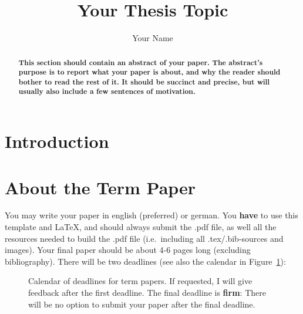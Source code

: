 \documentclass[twocolumn, a4paper, 10pt]{article}
\begin{document}
\title{\Large Your Thesis Topic}

\author{
	Your Name
}

\maketitle

\def\abstractname{{\textbf Abstract}}
\begin{abstract}
{
\bfseries
This section should contain an abstract of your paper. The abstract's purpose is to report what your paper is about, and why the reader should bother to read the rest of it. It should be succinct and precise, but will usually also include a few sentences of motivation.
}
\end{abstract}


\section{Introduction}
\lipsum[1-3]
\section{About the Term Paper}
You may write your paper in english (preferred) or german. You \textbf{have} to use this template and \LaTeX, and should always submit the .pdf file, as well all the resources needed to build the .pdf file  (i.e.\ including all .tex/.bib-sources and images). Your final paper should be about 4-6 pages long (excluding bibliography). There will be two deadlines (see also the calendar in Figure~\ref{fig:calendar}):

\begin{figure}[t]
\centering
{}
\caption{Calendar of deadlines for term papers. If requested, I will give feedback after the first deadline. The final deadline is \textbf{firm}: There will be no option to submit your paper after the final deadline.}
\label{fig:calendar}
\end{figure}
\end{document}
